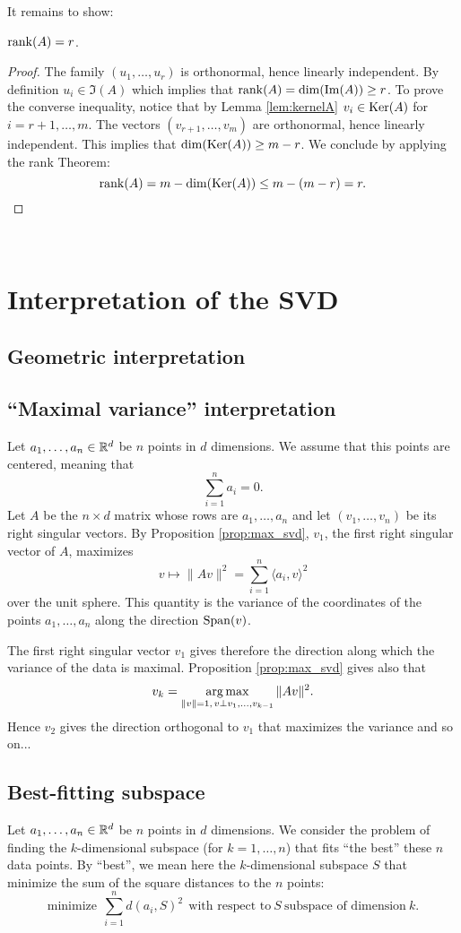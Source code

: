 \documentclass[11pt,nocut]{article}
\begin{document}
It remains to show:
\begin{lemma}
	${{\rm rank}}(A) = r$.
\end{lemma}
\begin{proof}
	The family $(u_1, \dots, u_r)$ is orthonormal, hence linearly independent. By definition $u_i \in \Im(A)$ which implies that ${{\rm rank}}(A) = {{\rm dim}}({{\rm Im}}(A)) \geq r$.
	To prove the converse inequality, notice that by Lemma \ref{lem:kernelA} $v_i \in {{\rm Ker}}(A)$ for $i=r+1, \dots, m$.
	The vectors $(v_{r+1}, \dots, v_m)$ are orthonormal, hence linearly independent. This implies that ${{\rm dim}}({{\rm Ker}}(A)) \geq m-r$. We conclude by applying the rank Theorem:
	$$
	{{\rm rank}}(A) = m - {{\rm dim}}({{\rm Ker}}(A)) \leq m - (m-r) = r.
	$$
\end{proof}
\\

\section{Interpretation of the SVD}

\subsection{Geometric interpretation}

\subsection{``Maximal variance'' interpretation}
Let $a_1, \dots, a_n \in \mathbb{R}^d$ be $n$ points in $d$ dimensions. We assume that this points are centered, meaning that 
$$
\sum_{i=1}^n a_i = 0.
$$
Let $A$ be the $n \times d$ matrix whose rows are $a_1, \dots, a_n$ and let $(v_1, \dots, v_n)$ be its right singular vectors.
By Proposition \ref{prop:max_svd}, $v_1$, the first right singular vector of $A$, maximizes
$$
v \mapsto \|A v\|^2 =  \sum_{i=1}^n \langle a_i, v \rangle^2
$$
over the unit sphere.
This quantity is the variance of the coordinates of the points $a_1, \dots, a_n$ along the direction ${{\rm Span}}(v)$.

The first right singular vector $v_1$ gives therefore the direction along which the variance of the data is maximal. Proposition \ref{prop:max_svd} gives also that
\begin{equation}
	v_{k} = \operatorname*{arg\,max}_{\|v\| = 1, \, v \perp v_1, \dots, v_{k-1}} \| A v \|^2.
\end{equation}
Hence $v_2$ gives the direction orthogonal to $v_1$ that maximizes the variance and so on...
\subsection{Best-fitting subspace}
Let $a_1, \dots, a_n \in \mathbb{R}^d$ be $n$ points in $d$ dimensions.
We consider the problem of finding the $k$-dimensional subspace (for $k = 1, \dots, n$) that fits ``the best'' these $n$ data points. By ``best'', we mean here the $k$-dimensional subspace $S$ that minimize the sum of the square distances to the $n$ points:
\begin{equation}\label{eq:fit}
	\text{minimize} \ \ \sum_{i=1}^n d(a_i, S)^2 \ \ \text{with respect to} \ S \ \text{subspace of dimension} \ k.
\end{equation}
\end{document}
